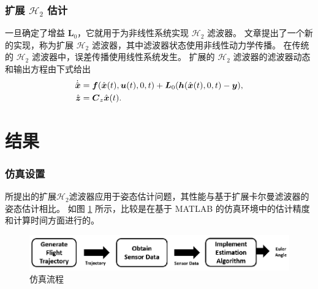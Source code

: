 \documentclass{beamer}
\newcommand{\vo}[1]{\boldsymbol{#1}}
\begin{document}
\begin{frame}
	\frametitle{扩展 $\mathcal{H}_2$ 估计}
	一旦确定了增益 $\vo{L}_0$，它就用于为非线性系统实现 $\mathcal{H}_2$ 滤波器。 文章提出了一个新的实现，称为扩展 $\mathcal{H}_2$ 滤波器，其中滤波器状态使用非线性动力学传播。 在传统的 $\mathcal{H}_2$ 滤波器中，误差传播使用线性系统发生。 扩展的 $\mathcal{H}_2$ 滤波器的滤波器动态和输出方程由下式给出
	\begin{subequations}\label{estimator}
		\begin{align}
			\Dot{\Hat{\vo{x}}} &= \vo{f}(\hat{\vo{x}}(t),\vo{u}(t),0,t) +  \vo{L}_0(\vo{h}(\Hat{\vo{x}}(t),0,t) - \vo{y}),\\
			\hat{\vo{z}} &= \vo{C}_z \hat{\vo{x}}(t).
		\end{align}
	\end{subequations}
\end{frame}
	
	\section{结果}
	
	\begin{frame}
		\frametitle{仿真设置}
		所提出的扩展$\mathcal{H}_2$滤波器应用于姿态估计问题，其性能与基于扩展卡尔曼滤波器的姿态估计相比。 如图 \ref{sim_chart} 所示，比较是在基于 MATLAB 的仿真环境中的估计精度和计算时间方面进行的。
		\begin{figure}[h!]
			\centering
			\includegraphics[width=\textwidth]{flow.pdf}
			\caption{仿真流程}
			\label{sim_chart}
		\end{figure}
	\end{frame}
	
\end{document}
